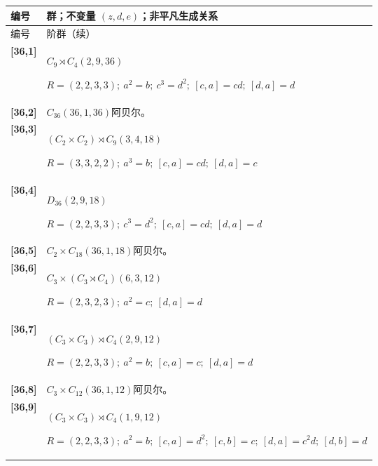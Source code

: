 \documentclass[UTF8,fontset=fandol,11pt,a4paper]{ctexart}
\begin{document}
\begin{longtable}{@{}p{17mm}>{\raggedright\arraybackslash}p{141mm}@{}}

\toprule 编号 & 群；不变量 $(z,d,e)$；非平凡生成关系\\\midrule\endfirsthead

\toprule 编号 & 36 阶群（续）\\\midrule\endhead\bottomrule\endfoot

\textbf{[36,1]} & $C_{9}\rtimes C_{4}$\quad $(2,9,36)$\par\(R=(2,2,3,3);\allowbreak\ a^{2}=b;\allowbreak\ c^{3}=d^{2};\allowbreak\ [c,a]=cd;\allowbreak\ [d,a]=d\)\\[3pt]

\textbf{[36,2]} & $C_{36}$\quad $(36,1,36)$\quad 阿贝尔。\\[3pt]

\textbf{[36,3]} & $(C_{2}\times C_{2})\rtimes C_{9}$\quad $(3,4,18)$\par\(R=(3,3,2,2);\allowbreak\ a^{3}=b;\allowbreak\ [c,a]=cd;\allowbreak\ [d,a]=c\)\\[3pt]

\textbf{[36,4]} & $D_{36}$\quad $(2,9,18)$\par\(R=(2,2,3,3);\allowbreak\ c^{3}=d^{2};\allowbreak\ [c,a]=cd;\allowbreak\ [d,a]=d\)\\[3pt]

\textbf{[36,5]} & $C_{2}\times C_{18}$\quad $(36,1,18)$\quad 阿贝尔。\\[3pt]

\textbf{[36,6]} & $C_{3}\times (C_{3}\rtimes C_{4})$\quad $(6,3,12)$\par\(R=(2,3,2,3);\allowbreak\ a^{2}=c;\allowbreak\ [d,a]=d\)\\[3pt]

\textbf{[36,7]} & $(C_{3}\times C_{3})\rtimes C_{4}$\quad $(2,9,12)$\par\(R=(2,2,3,3);\allowbreak\ a^{2}=b;\allowbreak\ [c,a]=c;\allowbreak\ [d,a]=d\)\\[3pt]

\textbf{[36,8]} & $C_{3}\times C_{12}$\quad $(36,1,12)$\quad 阿贝尔。\\[3pt]

\textbf{[36,9]} & $(C_{3}\times C_{3})\rtimes C_{4}$\quad $(1,9,12)$\par\(R=(2,2,3,3);\allowbreak\ a^{2}=b;\allowbreak\ [c,a]=d^{2};\allowbreak\ [c,b]=c;\allowbreak\ [d,a]=c^{2}d;\allowbreak\ [d,b]=d\)\\[3pt]


\end{longtable}
\end{document}
